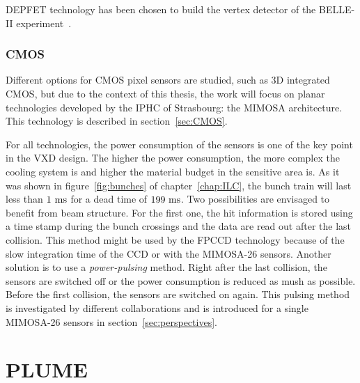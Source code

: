     \gls{DEPFET} technology has been chosen  to build the vertex detector of the BELLE-II experiment~\cite{depfetBelleII}.

   \subsubsection{CMOS}

   Different options for \gls{CMOS} pixel sensors are studied, such as 3D integrated \gls{CMOS}, but due to the context of this thesis, the work will focus on planar technologies developed by the \gls{IPHC} of Strasbourg: the \gls{MIMOSA} architecture. 
   This technology is described in section~\ref{sec:CMOS}.

   For all technologies, the power consumption of the sensors is one of the key point in the \gls{VXD} design.
   The higher the power consumption, the more complex the cooling system is and higher the material budget in the sensitive area is.
   As it was shown in figure~\ref{fig:bunches} of chapter~\ref{chap:ILC}, the bunch train will last less than $1~\rm{ms}$ for a dead time of $199~\rm{ms}$.
   Two possibilities are envisaged to benefit from beam structure.
   For the first one, the hit information is stored using a time stamp during the bunch crossings and the data are read out after the last collision.
   This method might be used by the \gls{FPCCD} technology because of the slow integration time of the \gls{CCD} or with the \gls{MIMOSA}-26 sensors.
   Another solution is to use a \textit{power-pulsing} method.
   Right after the last collision, the sensors are switched off or the power consumption is reduced as mush as possible.
   Before the first collision, the sensors are switched on again.
   This pulsing method is investigated by different collaborations and is introduced for a single \gls{MIMOSA}-26 sensors in section~\ref{sec:perspectives}. 
   
   
  \section{PLUME}

